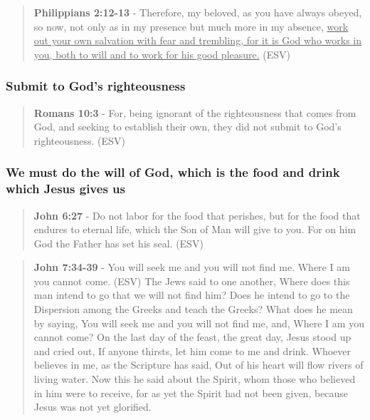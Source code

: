\documentclass[11pt]{article}
\begin{document}
\begin{quote}
\textbf{Philippians 2:12-13} - Therefore, my beloved, as you have always obeyed, so now, not only as in my presence but much more in my absence, \uline{work out your own salvation with fear and trembling, for it is God who works in you, both to will and to work for his good pleasure.} (ESV)
\end{quote}

\subsubsection{Submit to God's righteousness}
\label{sec:org0510995}
\begin{quote}
\textbf{Romans 10:3} - For, being ignorant of the righteousness that comes from God, and seeking to establish their own, they did not submit to God's righteousness. (ESV)
\end{quote}

\subsubsection{We must do the will of God, which is the food and drink which Jesus gives us}
\label{sec:org43b226b}
\begin{quote}
\textbf{John 6:27} - Do not labor for the food that perishes, but for the food that endures to eternal life, which the Son of Man will give to you. For on him God the Father has set his seal. (ESV)
\end{quote}

\begin{quote}
\textbf{John 7:34-39} - You will seek me and you will not find me. Where I am you cannot come. (ESV) The Jews said to one another, Where does this man intend to go that we will not find him? Does he intend to go to the Dispersion among the Greeks and teach the Greeks?  What does he mean by saying, You will seek me and you will not find me, and, Where I am you cannot come?  On the last day of the feast, the great day, Jesus stood up and cried out, If anyone thirsts, let him come to me and drink.  Whoever believes in me, as the Scripture has said, Out of his heart will flow rivers of living water.  Now this he said about the Spirit, whom those who believed in him were to receive, for as yet the Spirit had not been given, because Jesus was not yet glorified.
\end{quote}
\end{document}
